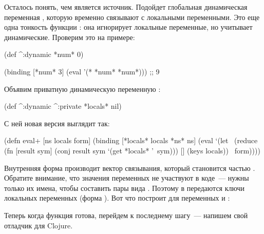 Осталось понять, чем является источник. Подойдет глобальная динамическая переменная , которую временно связывают с локальными переменными. Это еще одна тонкость функции : она игнорирует локальные переменные, но учитывает динамические. Проверим это на примере:

\begin{english}
  \begin{clojure}
(def ^:dynamic *num* 0)

(binding [*num* 3]
  (eval '(* *num* *num*)))
;; 9
  \end{clojure}
\end{english}

Объявим приватную динамическую переменную :

\begin{english}
  \begin{clojure}
(def ^:dynamic ^:private
  *locals* nil)
  \end{clojure}
\end{english}

С ней новая версия  выглядит так:

\begin{english}
  \begin{clojure}
(defn eval+ [ns locals form]
  (binding [*locals* locals
            *ns* ns]
    (eval `(let ~(reduce
                  (fn [result sym]
                    (conj result sym `(get *locals* '~sym)))
                  []
                  (keys locals))
             ~form))))
  \end{clojure}
\end{english}

Внутренняя форма  производит вектор связывания, который становится частью . Обратите внимание, что значения переменных не участвуют в коде~--- нужны только их имена, чтобы составить пары вида . Поэтому в  передаются ключи локальных переменных (форма ). Вот что построит  для переменных  и :

\begin{english}
  \begin{clojure}
  \end{clojure}
\end{english}

Теперь когда функция  готова, перейдем к последнему шагу~--- напишем свой отладчик для Clojure.

